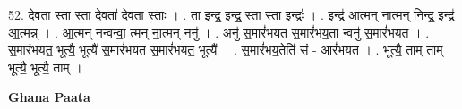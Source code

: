 \documentclass[17pt]{extarticle}
\begin{document}
52. दे॒वता॒ स्ता स्ता दे॒वता॑ दे॒वता॒ स्ताः । . ता इन्द्र॒ इन्द्र॒ स्ता स्ता इन्द्रः॑ । . इन्द्र॑ आ॒त्मन् ना॒त्मन् निन्द्र॒ इन्द्र॑ आ॒त्मन्न् । . आ॒त्मन् नन्वन्वा॒ त्मन् ना॒त्मन् ननु॑ । . अनु॑ स॒मारं॑भयत स॒मारं॑भय॒ता न्वनु॑ स॒मारं॑भयत । . स॒मारं॑भयत॒ भूत्यै॒ भूत्यै॑ स॒मारं॑भयत स॒मारं॑भयत॒ भूत्यै᳚ । . स॒मारं॑भय॒तेति॑ सं - आरं॑भयत । . भूत्यै॒ ताम् ताम् भूत्यै॒ भूत्यै॒ ताम् । \newline

\textbf{Ghana Paata } \newline
\end{document}
